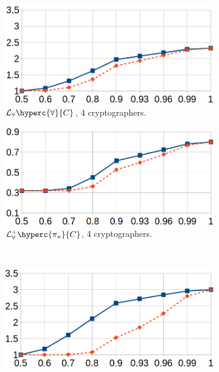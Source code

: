 \begin{figure}[ht]
\centering
\begin{subfigure}[b]{0.45\linewidth}
\includegraphics[width=\textwidth]{figures/dining-mult-4.png}
\caption{$\mathcal{L}_\forall\hyperc{\forall}{C}$, 4 cryptographers.}
\end{subfigure}
\hfill
\centering
\begin{subfigure}[b]{0.45\linewidth}
\includegraphics[width=\textwidth]{figures/dining-add-4.png}
\caption{$\mathcal{L}^+_\forall\hyperc{\pi_u}{C}$, 4 cryptographers.}
\end{subfigure}
\\ \vspace{3mm}
\begin{subfigure}[b]{0.45\linewidth}
\includegraphics[width=\textwidth]{figures/dining-mult-7.png}

\end{subfigure}
\end{figure}
